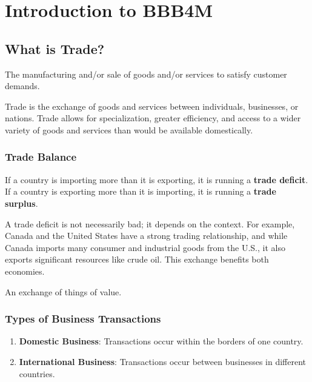 
\chapter{Introduction to BBB4M}
\setcounter{chapter}{1}

\section{What is Trade?}%

\begin{definition}[Business]
    The manufacturing and/or sale of goods and/or services
    to satisfy customer demands.
\end{definition}

Trade is the exchange of goods and services between individuals, businesses, 
or nations. Trade allows for specialization, greater efficiency, and access 
to a wider variety of goods and services than would be available domestically.

\subsection{Trade Balance}
If a country is importing more than it is exporting, it is running a 
\textbf{trade deficit}. If a country is exporting more than it is importing, 
it is running a \textbf{trade surplus}.

A trade deficit is not necessarily bad; it depends on the context. 
For example, Canada and the United States have a strong trading relationship, 
and while Canada imports many consumer and industrial goods from the U.S., 
it also exports significant resources like crude oil. This exchange benefits both economies.

\begin{definition}[Transaction]
    An exchange of things of value.
\end{definition}

\subsection{Types of Business Transactions}
\begin{enumerate}
	\item \textbf{Domestic Business}: Transactions occur within the borders of one country.
    \item \textbf{International Business}: Transactions occur between businesses in different countries.
\end{enumerate}

